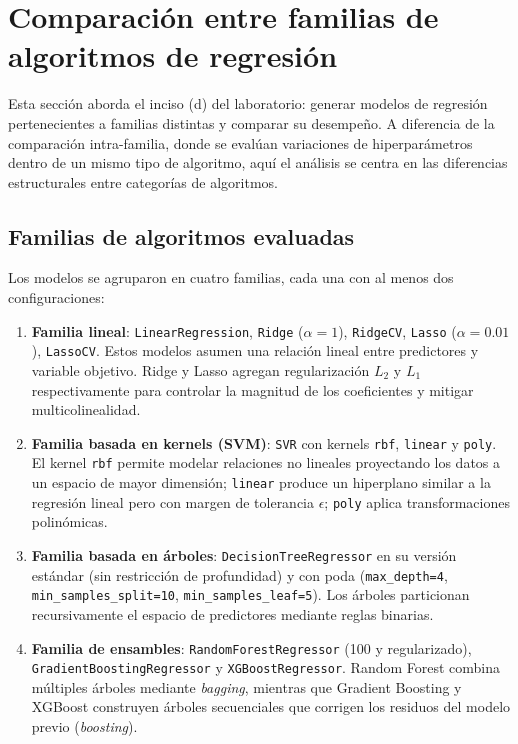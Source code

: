 
\section{Comparación entre familias de algoritmos de regresión}

Esta sección aborda el inciso (d) del laboratorio: generar modelos de regresión pertenecientes a familias distintas y comparar su desempeño. A diferencia de la comparación intra-familia, donde se evalúan variaciones de hiperparámetros dentro de un mismo tipo de algoritmo, aquí el análisis se centra en las diferencias estructurales entre categorías de algoritmos.

\subsection{Familias de algoritmos evaluadas}

Los modelos se agruparon en cuatro familias, cada una con al menos dos configuraciones:

\begin{enumerate}
    \item \textbf{Familia lineal}: \texttt{LinearRegression}, \texttt{Ridge} ($\alpha=1$), \texttt{RidgeCV}, \texttt{Lasso} ($\alpha=0.01$), \texttt{LassoCV}. Estos modelos asumen una relación lineal entre predictores y variable objetivo. Ridge y Lasso agregan regularización $L_2$ y $L_1$ respectivamente para controlar la magnitud de los coeficientes y mitigar multicolinealidad.
    \item \textbf{Familia basada en kernels (SVM)}: \texttt{SVR} con kernels \texttt{rbf}, \texttt{linear} y \texttt{poly}. El kernel \texttt{rbf} permite modelar relaciones no lineales proyectando los datos a un espacio de mayor dimensión; \texttt{linear} produce un hiperplano similar a la regresión lineal pero con margen de tolerancia $\epsilon$; \texttt{poly} aplica transformaciones polinómicas.
    \item \textbf{Familia basada en árboles}: \texttt{DecisionTreeRegressor} en su versión estándar (sin restricción de profundidad) y con poda (\texttt{max\_depth=4}, \texttt{min\_samples\_split=10}, \texttt{min\_samples\_leaf=5}). Los árboles particionan recursivamente el espacio de predictores mediante reglas binarias.
    \item \textbf{Familia de ensambles}: \texttt{RandomForestRegressor} (100 y regularizado), \texttt{GradientBoostingRegressor} y \texttt{XGBoostRegressor}. Random Forest combina múltiples árboles mediante \textit{bagging}, mientras que Gradient Boosting y XGBoost construyen árboles secuenciales que corrigen los residuos del modelo previo (\textit{boosting}).
\end{enumerate}

